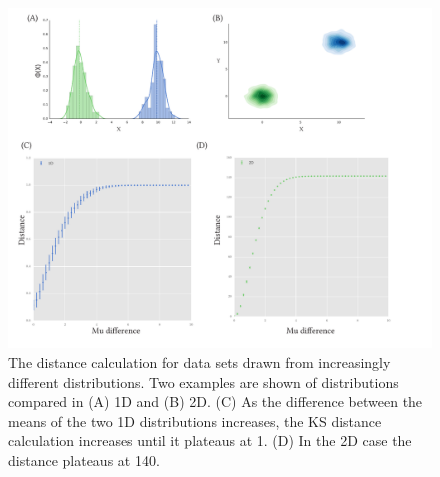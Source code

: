  
\begin{figure}[tb]
\centerfloat
\includegraphics[scale=0.8]{../../chapters/chapterABCFlow/images/mu_diff.pdf}
\caption[Range of distance values obtained using the Wald-Wolfowitz distance]{\label{fig:epsilon_mud}The distance calculation for data sets drawn from increasingly different distributions. Two examples are shown of distributions compared in (A) 1D and (B) 2D. (C) As the difference between the means of the two 1D distributions increases, the KS distance calculation increases until it plateaus at 1. (D) In the 2D case the distance plateaus at 140.}
\label{fig:normal_example}
\end{figure}



